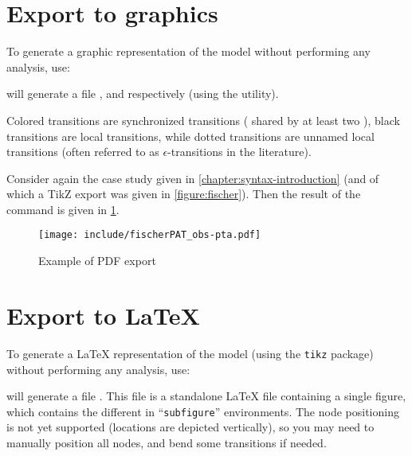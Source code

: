 \section{Export to graphics}

To generate a graphic representation of the \NIPTA{} model without performing any analysis, use:




\imitator{} will generate a file ,  and  respectively (using the \gdot{} utility).

Colored transitions are synchronized transitions (\ie{} shared by at least two \IPTA{}), black transitions are local transitions, while dotted transitions are unnamed local transitions (often referred to as $\epsilon$-transitions in the literature).

\begin{example}
	Consider again the case study given in \cref{chapter:syntax-introduction} (and of which a TikZ export was given in \cref{figure:fischer}).
	Then the result of the  command is given in \cref{figure:PDF-export}.
\end{example}

\begin{figure}
	\texttt{[image: include/fischerPAT\_obs-pta.pdf]}

	\caption{Example of PDF export}
	\label{figure:PDF-export}
\end{figure}




\section{Export to \LaTeX{}}

To generate a \LaTeX{} representation of the \NIPTA{} model (using the \texttt{tikz} package) without performing any analysis, use:


\imitator{} will generate a file .
This file is a standalone \LaTeX{} file containing a single figure, which contains the different \IPTA{} in ``\texttt{subfigure}'' environments.
The node positioning is not yet supported (locations are depicted vertically), so you may need to manually position all nodes, and bend some transitions if needed.


